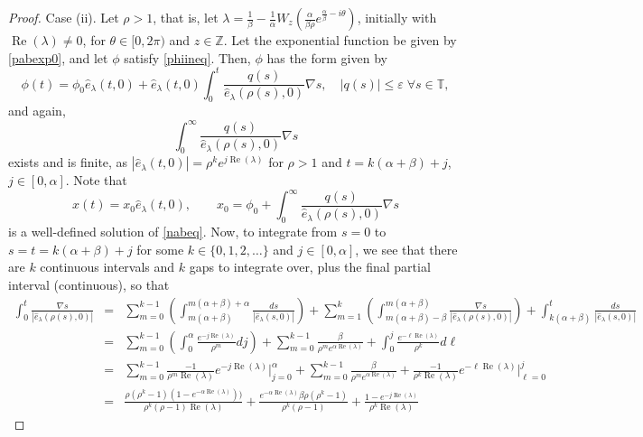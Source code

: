 \documentclass[10pt,a4paper]{amsart}
\newcommand{\T}{\ensuremath{\mathbb{T}}}
\newcommand{\Z}{\ensuremath{\mathbb{Z}}}
\begin{document}
\begin{proof}
Case (ii). Let $\rho>1$, that is, let $\lambda = \frac{1}{\beta}-\frac{1}{\alpha}W_z\left(\frac{\alpha}{\beta \rho}e^{\frac{\alpha}{\beta}-i\theta}\right)$, initially with $\operatorname{Re}(\lambda)\ne 0$, for $\theta\in[0,2\pi)$ and $z\in\Z$. Let the exponential function be given by \eqref{pabexp0}, and let $\phi$ satisfy \eqref{phiineq}. Then, $\phi$ has the form given by 
\begin{equation}\label{phieqform}
 \phi(t)=\phi_0\widehat{e}_{\lambda}(t,0)+\widehat{e}_{\lambda}(t,0) \int_0^t\frac{q(s)}{\widehat{e}_{\lambda}(\rho(s),0)}\nabla s, \quad |q(s)|\le\varepsilon\; \forall s\in\T,  
\end{equation}
and again,
$$ \int_0^{\infty} \frac{q(s)}{\widehat{e}_{\lambda}(\rho(s),0)}\nabla s $$
exists and is finite, as $|\widehat{e}_{\lambda}(t,0)|=\rho^ke^{j\operatorname{Re}(\lambda)}$ for $\rho>1$ and $t=k(\alpha+\beta)+j$, $j\in[0,\alpha]$. Note that 
$$ x(t) = x_0\widehat{e}_{\lambda}(t,0), \qquad x_0=\phi_0 + \int_0^{\infty} \frac{q(s)}{\widehat{e}_{\lambda}(\rho(s),0)}\nabla s $$
is a well-defined solution of \eqref{nabeq}.
Now, to integrate from $s=0$ to $s=t=k(\alpha+\beta)+j$ for some $k\in\{0,1,2,\ldots\}$ and $j\in[0,\alpha]$, we see that there are $k$ continuous intervals and $k$ gaps to integrate over, plus the final partial interval (continuous), so that
\begin{eqnarray}
 \int_{0}^{t} \frac{\nabla s}{|\widehat{e}_{\lambda}(\rho(s),0)|} 
  &=& \sum_{m=0}^{k-1}\left(\int_{m(\alpha+\beta)}^{m(\alpha+\beta)+\alpha}\frac{ds}{|\widehat{e}_{\lambda}(s,0)|}\right)+\sum_{m=1}^{k}\left(\int_{m(\alpha+\beta)-\beta}^{m(\alpha+\beta)}\frac{\nabla s}{|\widehat{e}_{\lambda}(\rho(s),0)|}\right)+\int_{k(\alpha+\beta)}^{t}\frac{ds}{|\widehat{e}_{\lambda}(s,0)|} \nonumber\\
	&=& \sum_{m=0}^{k-1}\left(\int_{0}^{\alpha}\frac{e^{-j\operatorname{Re}(\lambda)}}{\rho^{m}}dj\right)+\sum_{m=0}^{k-1}\frac{\beta}{\rho^me^{\alpha\operatorname{Re}(\lambda)}} +\int_{0}^{j}\frac{e^{-\ell\operatorname{Re}(\lambda)}}{\rho^{k}}d\ell \nonumber\\
	&=& \sum_{m=0}^{k-1}\frac{-1}{\rho^m\operatorname{Re}(\lambda)}e^{-j\operatorname{Re}(\lambda)}\bigg|_{j=0}^{\alpha}+\sum_{m=0}^{k-1}\frac{\beta}{\rho^me^{\alpha\operatorname{Re}(\lambda)}}+\frac{-1}{\rho^k\operatorname{Re}(\lambda)}e^{-\ell\operatorname{Re}(\lambda)}\bigg|_{\ell=0}^{j} \nonumber\\
	&=& \frac{\rho(\rho^k-1)(1-e^{-\alpha\operatorname{Re}(\lambda)}))}{\rho^k(\rho-1)\operatorname{Re}(\lambda)} + \frac{e^{-\alpha\operatorname{Re}(\lambda)}\beta \rho(\rho^k-1)}{\rho^k(\rho-1)} + \frac{1-e^{-j\operatorname{Re}(\lambda)}}{\rho^k\operatorname{Re}(\lambda)} \label{int0tot}

\end{eqnarray}
\end{proof}
\end{document}
